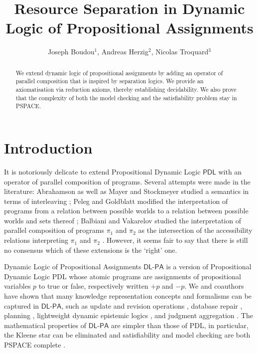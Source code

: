 \documentclass{llncs}
\title{Resource Separation in Dynamic Logic of Propositional Assignments }
\author{Joseph Boudou$^1$, Andreas Herzig$^2$, Nicolas Troquard$^3$}
\institute{
  IRIT, University of Toulouse, France \and
  IRIT, CNRS, France \and
  Free University of Bozen-Bolzano, Italy 
}
\newcommand{\Dlpa}{\ensuremath{\mathsf{DL\text{-}PA}}\xspace}
\newcommand{\Pdl}{\ensuremath{\mathsf{PDL}}\xspace}
\newcommand{\assgntop}[1]{{\mathtt {+} #1}}
\newcommand{\assgnbot}[1]{{\mathtt {-} #1}}
\begin{document}
\maketitle

\begin{abstract}
We extend dynamic logic of propositional assignments by adding an operator of parallel composition that is inspired by separation logics. 
We provide an axiomatisation via reduction axioms, thereby establishing decidability. 
We also prove that the complexity of both the model checking and the satisfiability problem stay in PSPACE.
\end{abstract}


\section{Introduction}

It is notoriously delicate to extend Propositional Dynamic Logic \Pdl with an operator of parallel composition of programs. 
Several attempts were made in the literature:
Abrahamson as well as Mayer and Stockmeyer studied a semantics in terms of interleaving \cite{Abrahamson80,MayerS96}; 
Peleg and Goldblatt modified the interpretation of programs from a relation between possible worlds to a relation between
possible worlds and sets thereof \cite{Peleg87,Goldblatt92}; 
Balbiani and Vakarelov studied the interpretation of parallel composition of programs $\pi_1$ and $\pi_2$ as 
the intersection of the accessibility relations interpreting $\pi_1$ and $\pi_2$ \cite{BalbianiV03}. 
However, it seems fair to say that there is still no consensus which of these extensions is the `right' one. 

Dynamic Logic of Propositional Assignments \Dlpa \cite{BalbianiHerzigTroquard-Lics13,BalbianiHST14} 
is a version of Propositional Dynamic Logic PDL whose atomic programs are 
assignments of propositional variables $p$ to true or false, respectively written $\assgntop p$ and $\assgnbot p$. 
We and coauthors have shown that many knowledge representation concepts and formalisms can be captured in \Dlpa, such as 
update and revision operations \cite{Herzig-Kr14}, 
database %
repair 
\cite{%
FeuilladeHR19}, 
planning \cite{HerzigEtal-Ecai14},
lightweight dynamic epistemic logics \cite{DBLP:conf/atal/CharrierS15,CooperHMMR16,DBLP:conf/atal/CharrierS17}, and
judgment aggregation \cite{DBLP:journals/logcom/NovaroGH18}. 
The mathematical properties of \Dlpa are simpler than those of PDL, in particular, 
the Kleene star can be eliminated \cite{BalbianiHerzigTroquard-Lics13} and 
satisfiability and model checking are both PSPACE complete \cite{BalbianiHST14}. 
\end{document}
